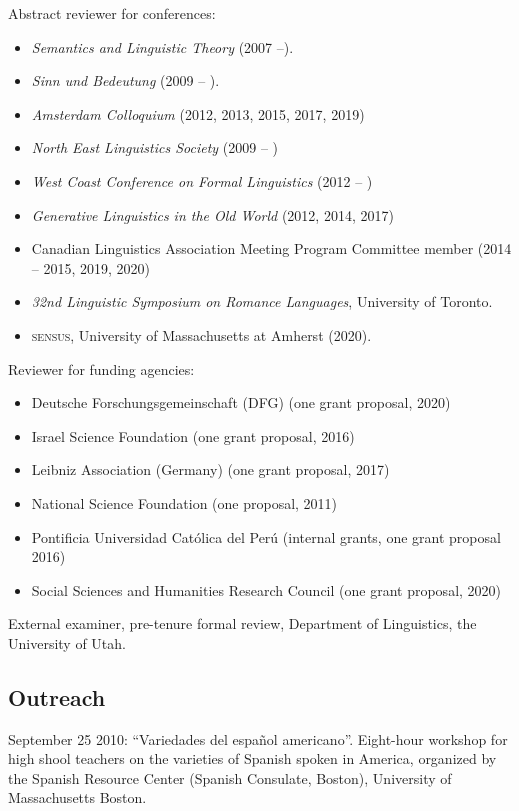 \documentclass[11pt]{article}
\begin{document}
Abstract reviewer for conferences:

\begin{itemize}
\item[] \textit{Semantics and Linguistic Theory} (2007 --).
\item[] \textit{Sinn und Bedeutung} (2009 -- ).
\item [] \textit{Amsterdam Colloquium} (2012, 2013, 2015, 2017, 2019)
\item[] \textit{North East Linguistics Society} (2009 -- )
\item[] \textit{West Coast Conference on Formal Linguistics} (2012 -- )
\item[] \textit{Generative Linguistics in the Old World} (2012, 2014, 2017)
\item[] Canadian Linguistics Association Meeting Program Committee member (2014 -- 2015, 2019, 2020)
\item[] \textit{32nd Linguistic Symposium on Romance Languages}, University of Toronto.
\item[] \textsc{sensus}, University of Massachusetts at Amherst (2020).
\end{itemize}


Reviewer for funding agencies:

\begin{itemize}
  \item[] Deutsche Forschungsgemeinschaft (DFG) (one grant proposal, 2020)
  \item[] Israel Science Foundation (one grant proposal, 2016)
  \item[] Leibniz Association (Germany) (one grant proposal, 2017)
  \item[] National Science Foundation (one proposal, 2011)
  \item[] Pontificia Universidad Cat\'olica del Per\'u (internal grants, one grant proposal 2016)
  \item[] Social Sciences and Humanities Research Council (one grant proposal, 2020)
  \end{itemize}


External examiner, pre-tenure formal review, Department of Linguistics, the University of Utah.


\subsection*{Outreach}


September 25 2010: ``Variedades del espa\~nol americano''. Eight-hour
workshop for high shool teachers on the varieties of Spanish spoken in America, organized by the
Spanish Resource Center (Spanish Consulate, Boston), University of Massachusetts Boston.
\end{document}
